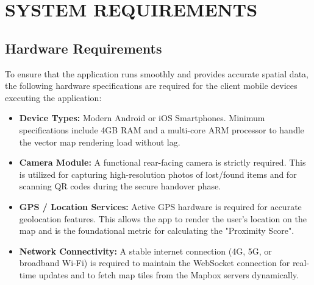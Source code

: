 \documentclass[12pt,a4paper]{report}
\begin{document}
\chapter{SYSTEM REQUIREMENTS}

\section{Hardware Requirements}
To ensure that the application runs smoothly and provides accurate spatial data, the following hardware specifications are required for the client mobile devices executing the application:
\begin{itemize}
\item \textbf{Device Types:} Modern Android or iOS Smartphones. Minimum specifications include 4GB RAM and a multi-core ARM processor to handle the vector map rendering load without lag.
\item \textbf{Camera Module:} A functional rear-facing camera is strictly required. This is utilized for capturing high-resolution photos of lost/found items and for scanning QR codes during the secure handover phase.
\item \textbf{GPS / Location Services:} Active GPS hardware is required for accurate geolocation features. This allows the app to render the user's location on the map and is the foundational metric for calculating the "Proximity Score".
\item \textbf{Network Connectivity:} A stable internet connection (4G, 5G, or broadband Wi-Fi) is required to maintain the WebSocket connection for real-time updates and to fetch map tiles from the Mapbox servers dynamically.
\end{itemize}

\newpage %
\end{document}
